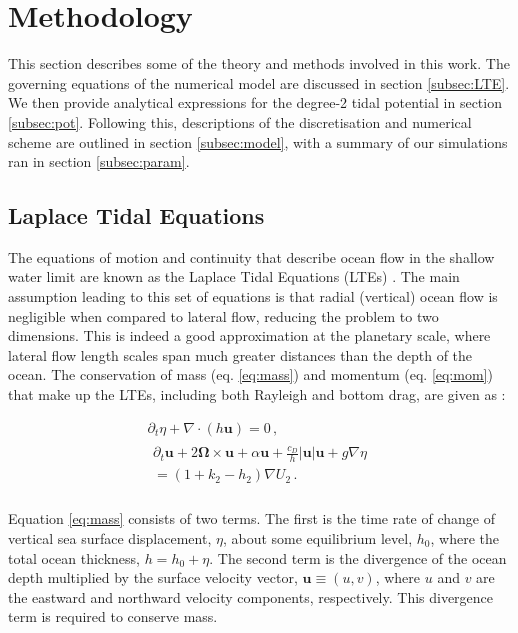 \section{Methodology}\label{sec:method}

This section describes some of the theory and methods involved in this work. The governing equations of the numerical model are discussed in section \ref{subsec:LTE}. We then provide analytical expressions for the degree-2 tidal potential in section \ref{subsec:pot}. Following this, descriptions of the discretisation and numerical scheme are outlined in section \ref{subsec:model}, with a summary of our simulations ran in section \ref{subsec:param}.

\subsection{Laplace Tidal Equations \label{subsec:LTE}}

The equations of motion and continuity that describe ocean flow in the shallow water limit are known as the Laplace Tidal Equations (LTEs) \citep{lamb1932hydrodynamics}. The main assumption leading to this set of equations is that radial (vertical) ocean flow is negligible when compared to lateral flow, reducing the problem to two dimensions. This is indeed a good approximation at the planetary scale, where lateral flow length scales span much greater distances than the depth of the ocean. The conservation of mass (eq. \ref{eq:mass}) and momentum (eq. \ref{eq:mom}) that make up the LTEs, including both Rayleigh and bottom drag, are given as \citep{sears1995tidal,tyler2008strong,matsuyama2014tidal}:


\vspace{-0.5cm}
\begin{gather}
\partial_t \eta + \nabla \cdot \left(h \bm{u}\right) = 0\, , \label{eq:mass}\\
\begin{aligned} 
\partial_t \bm{u} + 2 \bm{\Omega} \times \bm{u} + \alpha\bm{u} + \frac{c_D}{h} \left|\bm{u}\right| \bm{u}  + g \nabla \eta \\ = (1 + k_2 - h_2) \nabla U_2 \, . \label{eq:mom}\\
\end{aligned} 
\end{gather}

Equation \ref{eq:mass} consists of two terms. The first is the time rate of change of vertical sea surface displacement, $\eta$, about some equilibrium level, $h_0$, where the total ocean thickness, $h = h_0 + \eta$. The second term is the divergence of the ocean depth multiplied by the surface velocity vector, $\bm{u} \equiv (u, v)$, where $u$ and $v$ are the eastward and northward velocity components, respectively. This divergence term is required to conserve mass.

